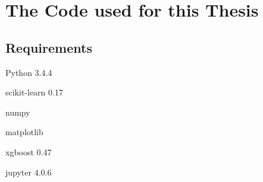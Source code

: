\section{The Code used for this Thesis}\label{app:code}

\subsection{Requirements}

Python 3.4.4

scikit-learn 0.17

numpy

matplotlib

xgboost 0.47


jupyter 4.0.6